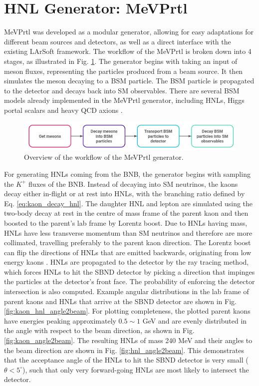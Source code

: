 \section{HNL Generator: MeVPrtl}
\label{sec:gen_mevprtl}

MeVPrtl was developed as a modular generator, allowing for easy adaptations for different beam sources and detectors, as well as a direct interface with the existing LArSoft framework.
The workflow of the MeVPrtl is broken down into 4 stages, as illustrated in Fig. \ref{fig:MeVPrtl_Workflow}.
The generator begins with taking an input of meson fluxes, representing the particles produced from a beam source.
It then simulates the meson decaying to a BSM particle.
The BSM particle is propagated to the detector and decays back into SM observables.
There are several BSM models already implemented in the MeVPrtl generator, including HNLs, Higgs portal scalars \cite{higgs_scalar} and heavy QCD axions \cite{qcd_axion}.

\begin{figure}[htbp!] 
\centering    
\includegraphics[width=1.0\textwidth]{MeVPrtl_Workflow}
\caption[MeVPrtl_Workflow]{
Overview of the workflow of the MeVPrtl generator.
}
\label{fig:MeVPrtl_Workflow}
\end{figure}

For generating HNLs coming from the BNB, the generator begins with sampling the $K^{+}$ fluxes of the BNB.
Instead of decaying into SM neutrinos, the kaons decay either in-flight or at rest into HNLs, with the branching ratio defined by Eq. \ref{eq:kaon_decay_hnl}.
The daughter HNL and lepton are simulated using the two-body decay at rest in the centre of mass frame of the parent kaon and then boosted to the parent's lab frame by Lorentz boost.
Due to HNLs having mass, HNLs have less transverse momentum than SM neutrinos and therefore are more collimated, travelling preferably to the parent kaon direction.
The Lorentz boost can flip the directions of HNLs that are emitted backwards, originating from low energy kaons \cite{DavidePhD}.
HNLs are propagated to the detector by the ray tracing method, which forces HNLs to hit the SBND detector by picking a direction that impinges the particles at the detector's front face.  
The probability of enforcing the detector intersection is also computed.
Example angular distributions in the lab frame of parent kaons and HNLs that arrive at the SBND detector are shown in Fig. \ref{fig:kaon_hnl_angle2beam}.
For plotting completeness, the plotted parent kaons have energies peaking approximately $0.5\sim1$ GeV and are evenly distributed in the angle with respect to the beam direction, as shown in Fig. \ref{fig:kaon_angle2beam}.
The resulting HNLs of mass 240 MeV and their angles to the beam direction are shown in Fig. \ref{fig:hnl_angle2beam}.
This demonstrates that the acceptance angle of the HNLs to hit the SBND detector is very small ($\theta < 5^\circ$), such that only very forward-going HNLs are most likely to intersect the detector.

